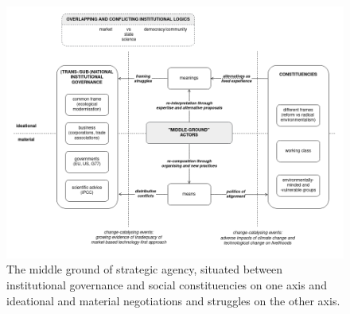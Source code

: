 \documentclass[a4paper, nobind]{templates/ociamthesis}
\begin{document}
\begin{figure}
\includegraphics[width=1\linewidth]{./figures/middle_ground} \caption[The middle ground of strategic environmental agency]{The middle ground of strategic agency, situated between institutional governance and social constituencies on one axis and ideational and material negotiations and struggles on the other axis.}\label{fig:unnamed-chunk-4}
\end{figure}
\end{document}
